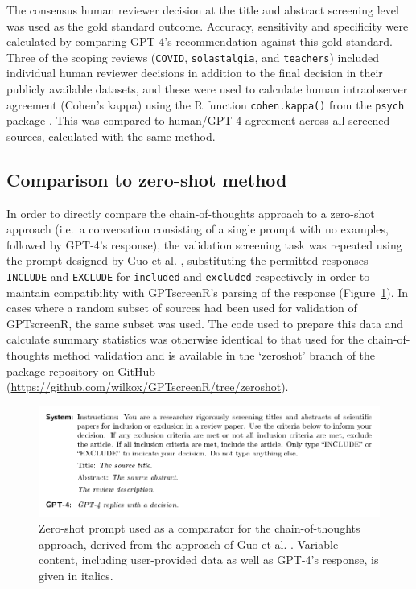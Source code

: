 \documentclass[10pt,a4paper,twocolumn]{article}
\begin{document}
The consensus human reviewer decision at the title and abstract screening level was used as the gold standard outcome. Accuracy, sensitivity and specificity were calculated by comparing GPT-4's recommendation against this gold standard. Three of the scoping reviews (\texttt{COVID}, \texttt{solastalgia}, and \texttt{teachers}) included individual human reviewer decisions in addition to the final decision in their publicly available datasets, and these were used to calculate human intraobserver agreement (Cohen's kappa) using the R function \texttt{cohen.kappa()} from the \texttt{psych} package \cite{Revelle.2023}. This was compared to human/GPT-4 agreement across all screened sources, calculated with the same method.

\subsection{Comparison to zero-shot method}

In order to directly compare the chain-of-thoughts approach to a zero-shot approach (i.e.~a conversation consisting of a single prompt with no examples, followed by GPT-4's response), the validation screening task was repeated using the prompt designed by Guo et al. \cite{Guo.2023}, substituting the permitted responses \texttt{INCLUDE} and \texttt{EXCLUDE} for \texttt{included} and \texttt{excluded} respectively in order to maintain compatibility with GPTscreenR's parsing of the response (Figure~\ref{fig:zeroshot_prompt}). In cases where a random subset of sources had been used for validation of GPTscreenR, the same subset was used. The code used to prepare this data and calculate summary statistics was otherwise identical to that used for the chain-of-thoughts method validation and is available in the `zeroshot' branch of the package repository on GitHub (\url{https://github.com/wilkox/GPTscreenR/tree/zeroshot}).

\setcounter{figure}{2}
\renewcommand\thefigure{\arabic{figure}}

\begin{figure}
\centering
\includegraphics{./fig_3.pdf}
  \caption{Zero-shot prompt used as a comparator for the chain-of-thoughts approach, derived from the approach of Guo et al. \cite{Guo.2023}. Variable content, including user-provided data as well as GPT-4's response, is given in italics.}
  \label{fig:zeroshot_prompt}
\end{figure}
\end{document}
